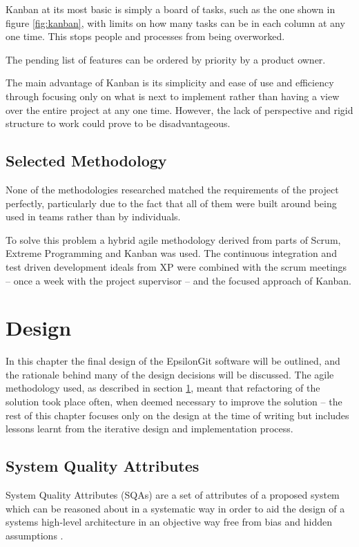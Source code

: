 \documentclass[11pt]{book}
\begin{document}
Kanban at its most basic is simply a board of tasks, such as the one shown in figure \ref{fig:kanban}, with limits on how many tasks can be in each column at any one time. This stops people and processes from being overworked.

The pending list of features can be ordered by priority by a product owner.

The main advantage of Kanban is its simplicity and ease of use and efficiency through focusing only on what is next to implement rather than having a view over the entire project at any one time. However, the lack of perspective and rigid structure to work could prove to be disadvantageous. 

\section{Selected Methodology} 
\label{selectedmethodology}
None of the methodologies researched matched the requirements of the project perfectly, particularly due to the fact that all of them were built around being used in teams rather than by individuals.

To solve this problem a hybrid agile methodology derived from parts of Scrum, Extreme Programming and Kanban was used. The continuous integration and test driven development ideals from XP were combined with the scrum meetings -- once a week with the project supervisor -- and the focused approach of Kanban.

\chapter{Design}
In this chapter the final design of the EpsilonGit software will be outlined, and the rationale behind many of the design decisions will be discussed. The agile methodology used, as described in section \ref{selectedmethodology}, meant that refactoring of the solution took place often, when deemed necessary to improve the solution -- the rest of this chapter focuses only on the design at the time of writing but includes lessons learnt from the iterative design and implementation process.

\section{System Quality Attributes}
System Quality Attributes (SQAs) are a set of attributes of a proposed system which can be reasoned about in a systematic way in order to aid the design of a systems high-level architecture in an objective way free from bias and hidden assumptions \cite{qualityattributes}.  
\end{document}
